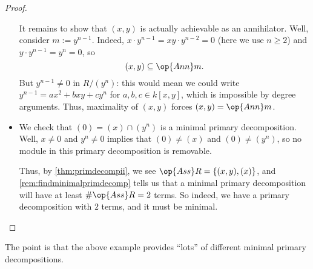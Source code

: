 \begin{proof}
\begin{itemize}
		It remains to show that $(x,y)$ is actually achievable as an annihilator. Well, consider $m:=y^{n-1}$. Indeed, $x\cdot y^{n-1}=xy\cdot y^{n-2}=0$ (here we use $n\ge2$) and $y\cdot y^{n-1}= y^n=0$, so
		\[(x,y)\subseteq\op{Ann}m.\]
		But $y^{n-1}\ne0$ in $R/\left(y^n\right)$: this would mean we could write $y^{n-1}=ax^2+bxy+cy^n$ for $a,b,c\in k[x,y]$, which is impossible by degree arguments. Thus, maximality of $(x,y)$ forces $(x,y)=\op{Ann}m$.

		\item We check that $(0)=(x)\cap\left(y^n\right)$ is a minimal primary decomposition. Well, $x\ne0$ and $y^n\ne0$ implies that $(0)\ne(x)$ and $(0)\ne\left(y^n\right)$, so no module in this primary decomposition is removable.
		
		Thus, by \autoref{thm:primdecompii}, we see $\op{Ass}R=\{(x,y),(x)\}$, and \autoref{rem:findminimalprimdecomp} tells us that a minimal primary decomposition will have at least $\#\op{Ass}R=2$ terms. So indeed, we have a primary decomposition with $2$ terms, and it must be minimal.
		\qedhere
	\end{itemize}
\end{proof}
The point is that the above example provides ``lots'' of different minimal primary decompositions.

